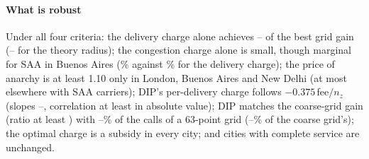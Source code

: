 \documentclass[preprint,11pt]{elsarticle}
\theoremstyle{definition}
\theoremstyle{remark}
\begin{document}
\begin{table}[tbp]\centering\small
\caption{Game results under four carrier criteria, three seeds, mean. PoA with the true expected routing cost and with the carriers' own (model) cost. DIP gain as \% of $|$social cost$|$ under each cost. Best uniform per-delivery charge on the coarse grid as a fraction of the fee. Weighted DIP charge: $u_z/$fee weighted by deliveries.}\label{tab:criterion}
\end{table}

\paragraph{What is robust} Under all four criteria: the delivery charge alone achieves \CritDelShareMin--\CritDelShareMax{} of the best grid gain (\CritDelShareMinTh--\CritDelShareMaxTh{} for the theory radius); the congestion charge alone is small, though marginal for SAA in Buenos Aires (\CritCongSaaBA\% against \CritDelSaaBA\% for the delivery charge); the price of anarchy is at least 1.10 only in London, Buenos Aires and New Delhi (at most \CritPoaAboveOther{} elsewhere with SAA carriers); DIP's per-delivery charge follows $-0.375\,$fee$/n_z$ (slopes \CritSlopeMin--\CritSlopeMax, correlation at least \CritCorrAbsMin{} in absolute value); DIP matches the coarse-grid gain (ratio at least \CritDipGridMin) with \CritDipCallsShareSixThreeMin--\CritDipCallsShareSixThreeMax\% of the calls of a 63-point grid (\CritDipCallsShareGridMin--\CritDipCallsShareGridMax\% of the coarse grid's); the optimal charge is a subsidy in every city; and cities with complete service are unchanged.
\end{document}
